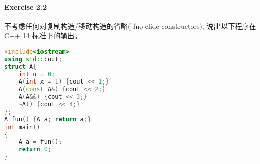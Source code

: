 \documentclass{article}
\begin{document}
	\paragraph*{Exercise 2.2} 
	
	不考虑任何对复制构造/移动构造的省略(-fno-elide-constructors), 说出以下程序在 C++ 14 标准下的输出。
	
	\begin{lstlisting}[language=C++]
#include<iostream>
using std::cout;
struct A{
	int u = 0;
	A(int x = 1) {cout << 1;}
	A(const A&) {cout << 2;}
	A(A&&) {cout << 3;}
	~A() {cout << 4;}
};
A fun() {A a; return a;}
int main() 
{
	A a = fun();
	return 0;
}
	\end{lstlisting}
	
\end{document}
